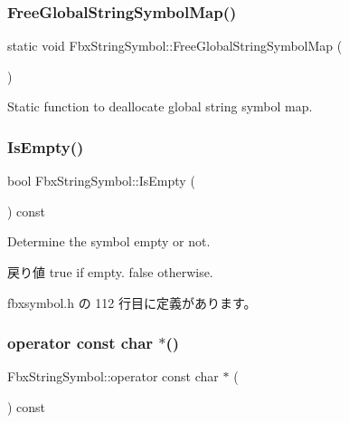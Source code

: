\subsubsection{\texorpdfstring{Free\+Global\+String\+Symbol\+Map()}{FreeGlobalStringSymbolMap()}}
{\footnotesize\ttfamily static void Fbx\+String\+Symbol\+::\+Free\+Global\+String\+Symbol\+Map (\begin{DoxyParamCaption}{ }\end{DoxyParamCaption})\hspace{0.3cm}{\ttfamily [static]}}



Static function to deallocate global string symbol map. 

\mbox{\label{class_fbx_string_symbol_ad3c688920d30664d24027e5c5d8e380a}} 
\subsubsection{\texorpdfstring{Is\+Empty()}{IsEmpty()}}
{\footnotesize\ttfamily bool Fbx\+String\+Symbol\+::\+Is\+Empty (\begin{DoxyParamCaption}{ }\end{DoxyParamCaption}) const\hspace{0.3cm}{\ttfamily [inline]}}

Determine the symbol empty or not. \begin{DoxyReturn}{戻り値}
{\ttfamily true} if empty. {\ttfamily false} otherwise. 
\end{DoxyReturn}


 fbxsymbol.\+h の 112 行目に定義があります。

\mbox{\label{class_fbx_string_symbol_ab73c7e02c66db24f6f570730b8f4c0ad}} 
\subsubsection{\texorpdfstring{operator const char $\ast$()}{operator const char *()}}
{\footnotesize\ttfamily Fbx\+String\+Symbol\+::operator const char $\ast$ (\begin{DoxyParamCaption}{ }\end{DoxyParamCaption}) const\hspace{0.3cm}{\ttfamily [inline]}}



